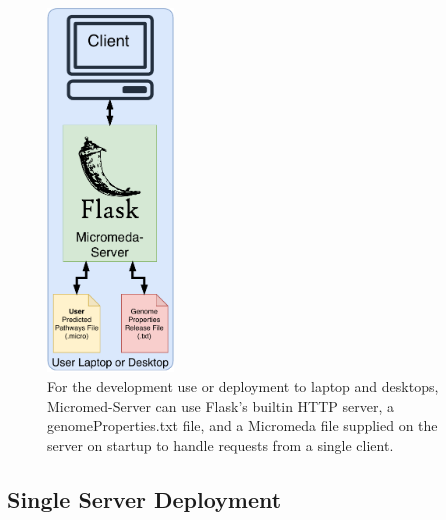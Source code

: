 \begin{figure}[!ht]
  \centering
	\includegraphics[width=0.30\textwidth]{media/micromeda-simple-deployment.pdf}
	 \caption{For the development use or deployment to laptop and desktops, Micromed-Server can use Flask's builtin HTTP server, a genomeProperties.txt file, and a Micromeda file supplied on the server on startup to handle requests from a single client.}
	 \label{fig:micromeda-small-deploy}
\end{figure}

\subsection{Single Server Deployment} \label{single-server-micromeda-deployment}

